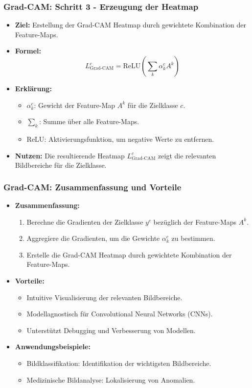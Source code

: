 \documentclass[aspectratio=1610, xcolor=dvipsnames, 9pt]{beamer}
\begin{document}
\begin{frame}
  \frametitle{Grad-CAM: Schritt 3 - Erzeugung der Heatmap}
  \begin{itemize}
    \item \textbf{Ziel:} Erstellung der Grad-CAM Heatmap durch gewichtete Kombination der Feature-Maps.
    \item \textbf{Formel:}
    \[
    L_{\text{Grad-CAM}}^c = \text{ReLU}\left(\sum_k \alpha_k^c A^k\right)
    \]
    \item \textbf{Erklärung:}
    \begin{itemize}
      \item $\alpha_k^c$: Gewicht der Feature-Map $A^k$ für die Zielklasse $c$.
      \item $\sum_k$: Summe über alle Feature-Maps.
      \item $\text{ReLU}$: Aktivierungsfunktion, um negative Werte zu entfernen.
    \end{itemize}
    \item \textbf{Nutzen:} Die resultierende Heatmap $L_{\text{Grad-CAM}}^c$ zeigt die relevanten Bildbereiche für die Zielklasse.
  \end{itemize}
\end{frame}

\begin{frame}
  \frametitle{Grad-CAM: Zusammenfassung und Vorteile}
  \begin{itemize}
    \item \textbf{Zusammenfassung:}
    \begin{enumerate}
      \item Berechne die Gradienten der Zielklasse $y^c$ bezüglich der Feature-Maps $A^k$.
      \item Aggregiere die Gradienten, um die Gewichte $\alpha_k^c$ zu bestimmen.
      \item Erstelle die Grad-CAM Heatmap durch gewichtete Kombination der Feature-Maps.
    \end{enumerate}
    \item \textbf{Vorteile:}
    \begin{itemize}
      \item Intuitive Visualisierung der relevanten Bildbereiche.
      \item Modellagnostisch für Convolutional Neural Networks (CNNs).
      \item Unterstützt Debugging und Verbesserung von Modellen.
    \end{itemize}
    \item \textbf{Anwendungsbeispiele:}
    \begin{itemize}
      \item Bildklassifikation: Identifikation der wichtigsten Bildbereiche.
      \item Medizinische Bildanalyse: Lokalisierung von Anomalien.
    \end{itemize}
  \end{itemize}
\end{frame}
\end{document}
